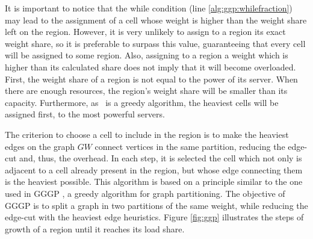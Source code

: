 It is important to notice that the while condition (line \ref{alg:ggp:whilefraction}) may lead to the assignment of a cell whose weight is higher than the weight share left on the region. However, it is very unlikely to assign to a region its exact weight share, so it is preferable to surpass this value, guaranteeing that every cell will be assigned to some region. Also, assigning to a region a weight which is higher than its calculated share does not imply that it will become overloaded. First, the weight share of a region is not equal to the power of its server. When there are enough resources, the region's weight share will be smaller than its capacity. Furthermore, as \ggp\ is a greedy algorithm, the heaviest cells will be assigned first, to the most powerful servers.



The criterion to choose a cell to include in the region is to make the heaviest edges on the graph $GW$ connect vertices in the same partition, reducing the edge-cut and, thus, the overhead. In each step, it is selected the cell which not only is adjacent to a cell already present in the region, but whose edge connecting them is the heaviest possible. This algorithm is based on a principle similar to the one used in GGGP \cite{karypis1999fah}, a greedy algorithm for graph partitioning. The objective of GGGP is to split a graph in two partitions of the same weight, while reducing the edge-cut with the heaviest edge heuristics. Figure \ref{fig:ggp} illustrates the steps of growth of a region until it reaches its load share.

